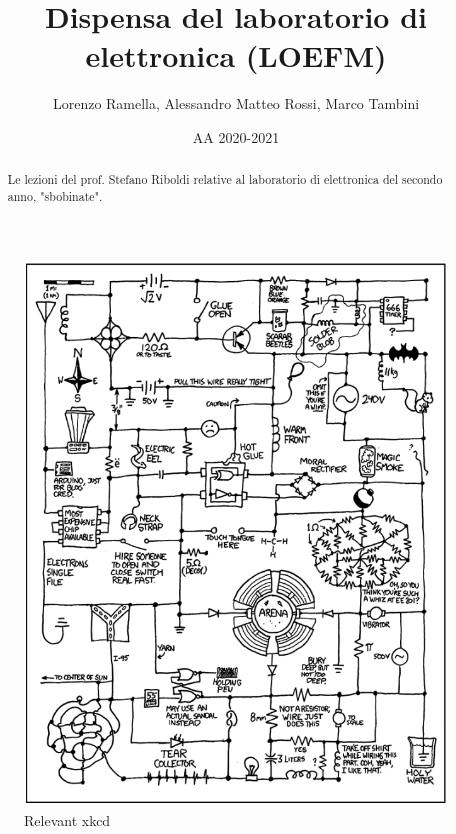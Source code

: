 \documentclass{article}
\title{Dispensa del laboratorio di elettronica (LOEFM)}
\author{Lorenzo Ramella, Alessandro Matteo Rossi, Marco Tambini}
\date{AA 2020-2021}
\begin{document}
\maketitle

\begin{figure}[h]
  \centering
  \includegraphics[scale=0.6]{IM_relevant_xkcd}
  \caption*{Relevant xkcd}
\end{figure}

\clearpage

\begin{abstract}

Le lezioni del prof. Stefano Riboldi relative al laboratorio di elettronica del secondo anno, "sbobinate".

\end{abstract}
\tableofcontents

\clearpage
\end{document}

